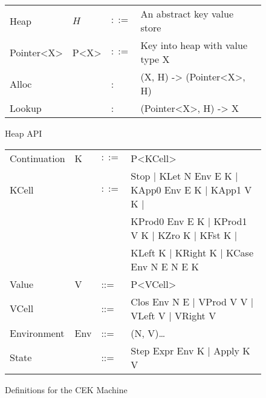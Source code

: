\documentclass[acmsmall]{acmart}
\newcommand\tablewidth{25em}
\begin{document}
	\begin{figure}
	\begin{tabular}{lllp{\tablewidth}}
	Heap & $H$ & $::=$ & An abstract key value store \\
	Pointer<X> & P<X> & $::=$ & Key into heap with value type X \\
	Alloc & & : & (X, H) -> (Pointer<X>, H) \\
	Lookup & & : & (Pointer<X>, H) -> X \\
	\end{tabular}
	\caption{Heap API}
	\end{figure}
	\begin{figure}
	\begin{tabular}{lllp{\tablewidth}}
		Continuation & K & $::=$ & P<KCell> \\

		KCell & & $::=$ & Stop | KLet N Env E K | KApp0 Env E K | KApp1 V K | \\
		& & & KProd0 Env E K | KProd1 V K | KZro K | KFst K | \\
		& & & KLeft K | KRight K | KCase Env N E N E K \\
		
		Value & V & ::= & P<VCell> \\
		VCell & & ::= & Clos Env N E | VProd V V | VLeft V | VRight V \\
		
		Environment & Env & ::= & (N, V)\dots \\
		State & & ::= & Step Expr Env K | Apply K V \\
	\end{tabular}
	\caption{Definitions for the CEK Machine}
	\end{figure}
\end{document}
